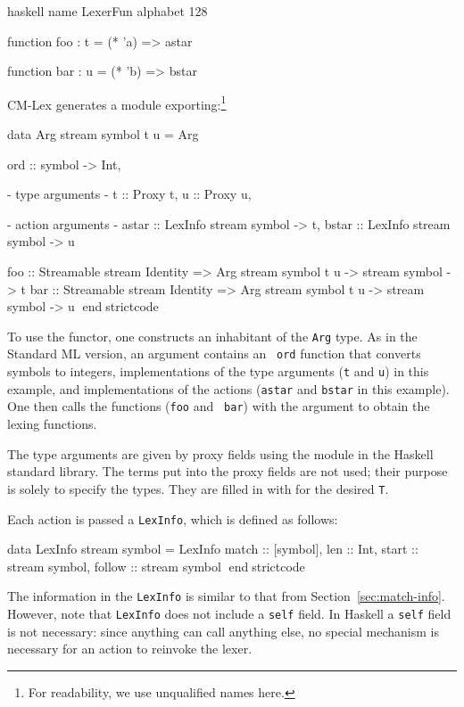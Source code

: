\documentclass[10pt]{article}
\begin{document}
\begin{strictcode}
\begin{strictcode}
\begin{strictcode}
\begin{strictcode}
\begin{code}
haskell
name LexerFun
alphabet 128

function foo : t =
  (* 'a) => astar

function bar : u =
  (* 'b) => bstar
\end{code}


CM-Lex generates a module exporting:\footnote{For readability, we
use unqualified names here.}


\begin{strictcode}
data Arg stream symbol t u =
   Arg { ord :: symbol -> Int,

         {- type arguments -}
         t :: Proxy t,
         u :: Proxy u,

         {- action arguments -}
         astar :: LexInfo stream symbol -> t,
         bstar :: LexInfo stream symbol -> u }

foo :: Streamable stream Identity
       => Arg stream symbol t u -> stream symbol -> t
bar :: Streamable stream Identity
       => Arg stream symbol t u -> stream symbol -> u
endstrictcode


To use the functor, one constructs an inhabitant of the {\tt Arg}
type.  As in the Standard ML version, an argument contains an {\tt
ord} function that converts symbols to integers, implementations of
the type arguments ({\tt t} and {\tt u}) in this example, and
implementations of the actions ({\tt astar} and {\tt bstar} in this
example).  One then calls the functions ({\tt foo} and {\tt
bar}) with the argument to obtain the lexing functions.

The type arguments are given by proxy fields using the
 module in the Haskell standard library.  The terms put into the
proxy fields are not used; their purpose is solely to specify the
types.  They are filled in with  for
the desired {\tt T}.

Each action is passed a {\tt LexInfo}, which is defined as follows:

\begin{strictcode}
data LexInfo stream symbol =
   LexInfo
   { match :: [symbol],
     len :: Int,
     start :: stream symbol,
     follow :: stream symbol }
endstrictcode

The information in the {\tt LexInfo} is similar to that from
Section~\ref{sec:match-info}.  However, note that {\tt LexInfo} does
not include a {\tt self} field.  In Haskell a {\tt self} field is not
necessary: since anything can call anything else, no special mechanism
is necessary for an action to reinvoke the lexer.



\end{strictcode}
\end{strictcode}
\end{strictcode}
\end{strictcode}
\end{strictcode}
\end{strictcode}
\end{document}
